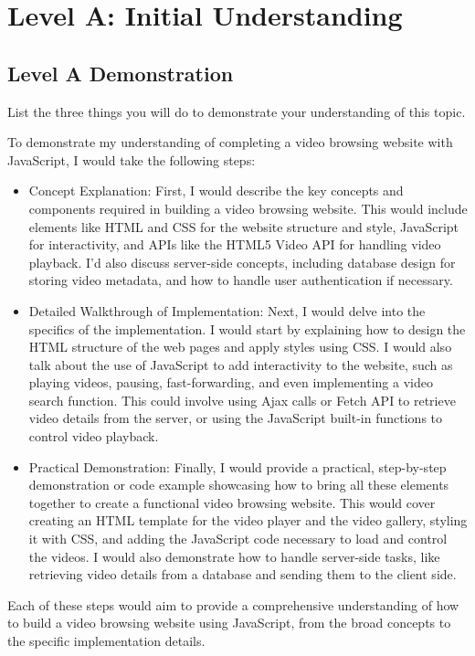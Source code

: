 \documentclass[a4paper, 11pt]{report}
\begin{document}

\tableofcontents





\newpage
\section{Level A: Initial Understanding}
\vspace{5mm}
\subsection{Level A Demonstration}
List the three things you will do to demonstrate your understanding of this topic.

To demonstrate my understanding of completing a video browsing website with JavaScript, I would take the following steps:
\begin{itemize}
\item Concept Explanation: First, I would describe the key concepts and components required in building a video browsing website. This would include elements like HTML and CSS for the website structure and style, JavaScript for interactivity, and APIs like the HTML5 Video API for handling video playback. I'd also discuss server-side concepts, including database design for storing video metadata, and how to handle user authentication if necessary.

\item Detailed Walkthrough of Implementation: Next, I would delve into the specifics of the implementation. I would start by explaining how to design the HTML structure of the web pages and apply styles using CSS. I would also talk about the use of JavaScript to add interactivity to the website, such as playing videos, pausing, fast-forwarding, and even implementing a video search function. This could involve using Ajax calls or Fetch API to retrieve video details from the server, or using the JavaScript built-in functions to control video playback.

\item Practical Demonstration: Finally, I would provide a practical, step-by-step demonstration or code example showcasing how to bring all these elements together to create a functional video browsing website. This would cover creating an HTML template for the video player and the video gallery, styling it with CSS, and adding the JavaScript code necessary to load and control the videos. I would also demonstrate how to handle server-side tasks, like retrieving video details from a database and sending them to the client side.
\end{itemize}
Each of these steps would aim to provide a comprehensive understanding of how to build a video browsing website using JavaScript, from the broad concepts to the specific implementation details.
\end{document}

